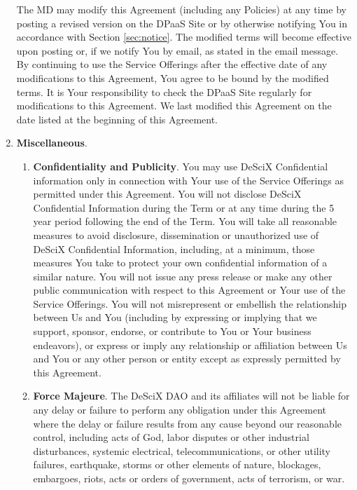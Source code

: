 \documentclass{article}
\begin{document}
\begin{enumerate}
    The MD may modify this Agreement (including any Policies) at any time by posting a revised version on the DPaaS Site or by otherwise notifying You in accordance with Section \ref{sec:notice}. The modified terms will become effective upon posting or, if we notify You by email, as stated in the email message. By continuing to use the Service Offerings after the effective date of any modifications to this Agreement, You agree to be bound by the modified terms. It is Your responsibility to check the DPaaS Site regularly for modifications to this Agreement. We last modified this Agreement on the date listed at the beginning of this Agreement.

    \item \textbf{Miscellaneous}. \label{sec:dpaas_misc}

    \begin{enumerate}
        \item \textbf{Confidentiality and Publicity}. You may use DeSciX Confidential information only in connection with Your use of the Service Offerings as permitted under this Agreement. You will not disclose DeSciX Confidential Information during the Term or at any time during the 5 year period following the end of the Term. You will take all reasonable measures to avoid disclosure, dissemination or unauthorized use of DeSciX Confidential Information, including, at a minimum, those measures You take to protect your own confidential information of a similar nature. You will not issue any press release or make any other public communication with respect to this Agreement or Your use of the Service Offerings. You will not misrepresent or embellish the relationship between Us and You (including by expressing or implying that we support, sponsor, endorse, or contribute to You or Your business endeavors), or express or imply any relationship or affiliation between Us and You or any other person or entity except as expressly permitted by this Agreement.
        
        \item \textbf{Force Majeure}. The DeSciX DAO and its affiliates will not be liable for any delay or failure to perform any obligation under this Agreement where the delay or failure results from any cause beyond our reasonable control, including acts of God, labor disputes or other industrial disturbances, systemic electrical, telecommunications, or other utility failures, earthquake, storms or other elements of nature, blockages, embargoes, riots, acts or orders of government, acts of terrorism, or war.
        

\end{enumerate}
\end{enumerate}
\end{document}
